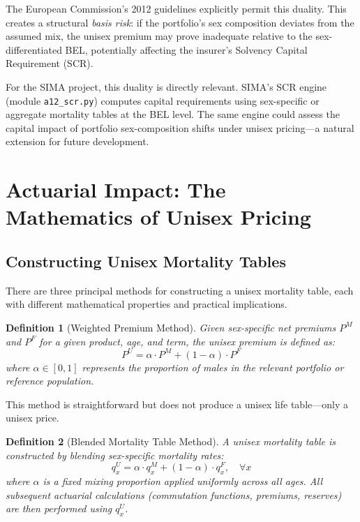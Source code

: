 \documentclass[12pt,a4paper]{article}
\newtheorem{definition}{Definition}[section]
\newcommand{\qx}[1]{q_{#1}}
\begin{document}
The European Commission's 2012 guidelines explicitly permit this duality. This creates a structural \emph{basis risk}: if the portfolio's sex composition deviates from the assumed mix, the unisex premium may prove inadequate relative to the sex-differentiated BEL, potentially affecting the insurer's Solvency Capital Requirement (SCR).

For the SIMA project, this duality is directly relevant. SIMA's SCR engine (module \texttt{a12\_scr.py}) computes capital requirements using sex-specific or aggregate mortality tables at the BEL level. The same engine could assess the capital impact of portfolio sex-composition shifts under unisex pricing---a natural extension for future development.


\section{Actuarial Impact: The Mathematics of Unisex Pricing}
\label{sec:actuarial}

\subsection{Constructing Unisex Mortality Tables}
\label{subsec:unisex-construction}

There are three principal methods for constructing a unisex mortality table, each
with different mathematical properties and practical implications.

\begin{definition}[Weighted Premium Method]
\label{def:weighted-premium}
Given sex-specific net premiums $P^M$ and $P^F$ for a given product, age, and
term, the unisex premium is defined as:
\begin{equation}
\label{eq:weighted-premium}
  P^U = \alpha \cdot P^M + (1 - \alpha) \cdot P^F
\end{equation}
where $\alpha \in [0,1]$ represents the proportion of males in the relevant
portfolio or reference population.
\end{definition}

This method is straightforward but does not produce a unisex life table---only
a unisex price.

\begin{definition}[Blended Mortality Table Method]
\label{def:blended-table}
A unisex mortality table is constructed by blending sex-specific mortality rates:
\begin{equation}
\label{eq:blended-qx}
  \qx{x}^U = \alpha \cdot \qx{x}^M + (1 - \alpha) \cdot \qx{x}^F, \quad \forall x
\end{equation}
where $\alpha$ is a fixed mixing proportion applied uniformly across all ages.
All subsequent actuarial calculations (commutation functions, premiums, reserves)
are then performed using $\qx{x}^U$.
\end{definition}
\end{document}
